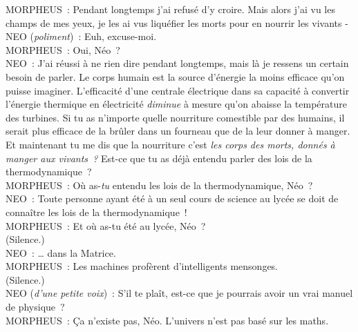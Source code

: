\begin{playdialog}
MORPHEUS~: Pendant longtemps j'ai refusé d'y croire.
Mais alors j'ai vu les champs de mes yeux, je les ai vus liquéfier les morts pour en nourrir les vivants -\\

NEO (\emph{poliment})~: Euh, excuse-moi.\\

MORPHEUS~: Oui, Néo~?\\

NEO~: J'ai réussi à ne rien dire pendant longtemps, mais là je ressens un certain besoin de parler.
Le corps humain est la source d'énergie la moins efficace qu'on puisse imaginer.
L'efficacité d'une centrale électrique dans sa capacité à convertir l'énergie thermique en électricité \emph{diminue} à mesure qu'on abaisse la température des turbines.
Si tu as n'importe quelle nourriture comestible par des humains, il serait plus efficace de la brûler dans un fourneau que de la leur donner à manger.
Et maintenant tu me dis que la nourriture c'est \emph{les corps des morts, donnés à manger aux vivants~?} Est-ce que tu as déjà entendu parler des lois de la thermodynamique~?\\

MORPHEUS~: Où as-\emph{tu} entendu les lois de la thermodynamique, Néo~?\\

NEO~: Toute personne ayant été à un seul cours de science au lycée se doit de connaître les lois de la thermodynamique~!\\

MORPHEUS~: Et où as-tu été au lycée, Néo~?\\

(Silence.)\\

NEO~: … dans la Matrice.\\

MORPHEUS~: Les machines profèrent d'intelligents mensonges.\\

(Silence.)\\

NEO (\emph{d'une petite voix})~: S'il te plaît, est-ce que je pourrais avoir un vrai manuel de physique~?\\

MORPHEUS~: Ça n'existe pas, Néo.
L'univers n'est pas basé sur les maths.\\ \end{playdialog}

